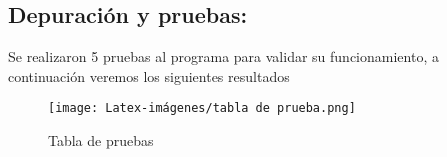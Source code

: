     
\subsection{\textbf{Depuración y pruebas:}}
Se realizaron 5 pruebas al programa para validar su funcionamiento, a continuación veremos los siguientes resultados 



   \begin{figure}[H]
    \centering
    \texttt{[image: Latex-imágenes/tabla de prueba.png]}
    \caption{Tabla de pruebas}
    \label{fig:Grafica de la distancia de dos puntos }
\end{figure}